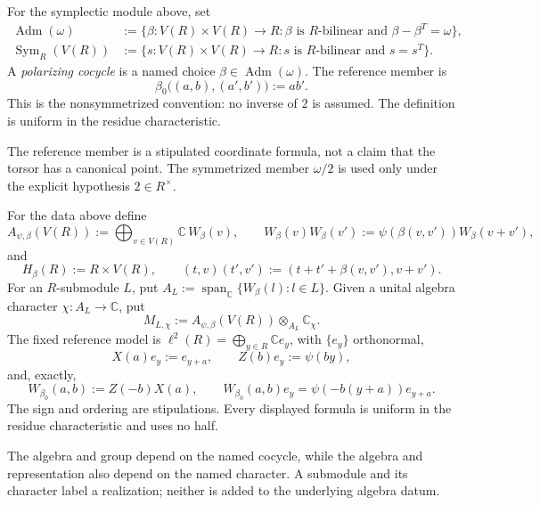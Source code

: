\begin{definition}
\label{def:local-polarizing-cocycle}
For the symplectic module above, set
\[
\begin{split}
 \operatorname{Adm}(\omega)
   &:=\{\beta:V(R)\times V(R)\to R:
          \beta\text{ is $R$-bilinear and }\beta-\beta^T=\omega\},\\
 \operatorname{Sym}_R(V(R))
   &:=\{s:V(R)\times V(R)\to R:
          s\text{ is $R$-bilinear and }s=s^T\}.
\end{split}
\]
A \emph{polarizing cocycle} is a named choice
$\beta\in\operatorname{Adm}(\omega)$.  The reference member is
\[
 \beta_0\big((a,b),(a',b')\big):=ab'.
\]
This is the nonsymmetrized convention: no inverse of $2$ is assumed.  The
definition is uniform in the residue characteristic.
\end{definition}

\begin{scope}
The reference member is a stipulated coordinate formula, not a claim that
the torsor has a canonical point.  The symmetrized member $\omega/2$ is used
only under the explicit hypothesis $2\in R^\times$.
\end{scope}


\begin{definition}
\label{def:local-weyl-system}
For the data above define
\[
 A_{\psi,\beta}(V(R)):=\bigoplus_{v\in V(R)}\mathbb C\,W_\beta(v),
 \qquad
 W_\beta(v)W_\beta(v')
   :=\psi(\beta(v,v'))W_\beta(v+v'),
\]
and
\[
 H_\beta(R):=R\times V(R),\qquad
 (t,v)(t',v'):=(t+t'+\beta(v,v'),v+v').
\]
For an $R$-submodule $L$, put
$A_L:=\operatorname{span}_{\mathbb C}\{W_\beta(l):l\in L\}$.  Given a unital
algebra character $\chi:A_L\to\mathbb C$, put
\[
 M_{L,\chi}:=A_{\psi,\beta}(V(R))
             \otimes_{A_L}\mathbb C_\chi.
\]
The fixed reference model is
$\ell^2(R)=\bigoplus_{y\in R}\mathbb C e_y$, with $\{e_y\}$ orthonormal,
\[
 X(a)e_y:=e_{y+a},\qquad Z(b)e_y:=\psi(by),
\]
and, exactly,
\[
 W_{\beta_0}(a,b):=Z(-b)X(a),\qquad
 W_{\beta_0}(a,b)e_y=\psi(-b(y+a))e_{y+a}.
\]
The sign and ordering are stipulations.  Every displayed formula is uniform
in the residue characteristic and uses no half.
\end{definition}

\begin{scope}
The algebra and group depend on the named cocycle, while the algebra and
representation also depend on the named character.  A submodule and its
character label a realization; neither is added to the underlying algebra
datum.
\end{scope}

